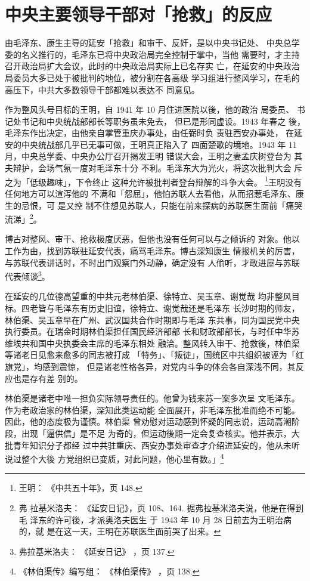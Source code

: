 \section{中央主要领导干部对「抢救」的反应}
由毛泽东、康生主导的延安「抢救」和审干、反奸，是以中央书记处、
中央总学委的名义推行的，毛泽东已将中央政治局完全控制于掌中，当他
需要时，才主持召开政治局扩大会议，此时的中央政治局实际上已名存实
亡，在延安的中央政治局委员大多已处于被批判的地位，被分割在各高级
学习组进行整风学习，在毛的高压下，中共大多数领导干部都难以表达不
同意见。

作为整风头号目标的王明，自 1941 年 10 月住进医院以後，他的政治 局委员、
书记处书记和中央统战部部长等职务虽未免去， 但已是形同虚设。1943 年春之
後，毛泽东作出决定，由他亲自掌管重庆办事处，由任弼时负 责驻西安办事处，
在延安的中央统战部几乎已无事可做，王明真正陷入了 四面楚歌的境地。1943 年
11 月，中央总学委、中央办公厅召开揭发王明 错误大会，王明之妻孟庆树登台为
其夫辩护，会场气氛一度对毛泽东十分 不利。毛泽东大为光火，将这次批判大会
斥之为「低级趣味」，下令终止 这种允许被批判者登台辩解的斗争大会。
\footnote{王明： 《中共五十年》，页 148.}王明没有任何地方可以渲泻他的
不满和「怨屈」，他怕苏联人去看他，从而招惹毛泽东、康生的忌恨，可 是又控
制不住想见苏联人，只能在前来探病的苏联医生面前「痛哭流涕」\footnote{弗
拉基米洛夫： 《延安日记》，页 108、164. 据弗拉基米洛夫说，他是在得到毛
泽东的许可後，才派奥洛夫医生 于 1943 年 10 月 28 日前去为王明治病的，就
是在这一天，王明在苏联医生面前哭了出来。}。

博古对整风、审干、抢救极度厌恶，但他也没有任何可以与之倾诉的
对象。他以工作为由，找到苏联驻延安代表，痛骂毛泽东。博古深知康生
情报机关的厉害，与苏联代表讲话时，不时出门观察门外动静，确定没有
人偷听，才敢进屋与苏联代表倾谈\footnote{弗拉基米洛夫：
《延安日记》
，页 137.}。

在延安的几位德高望重的中共元老林伯渠、徐特立、吴玉章、谢觉哉
均非整风目标。四老皆与毛泽东有历史旧谊，徐特立、谢觉哉还是毛泽东
长沙时期的师友，林伯渠、吴玉章早在广州、武汉国共合作时期即与毛泽
东共事，同为国民党中央执行委员。在瑞金时期林伯渠担任国民经济部部
长和财政部部长，与时任中华苏维埃共和国中央执委会主席的毛泽东相处
融洽。整风转入审干、抢救後，林伯渠等诸老日见愈来愈多的同志被打成
「特务」、「叛徒」，国统区中共组织被诬为「红旗党」，均感到震惊，
但是诸老性格各异，对党内斗争的体会各自深浅不同，其反应也是存有差
别的。

林伯渠是诸老中唯一担负实际领导责任的。他曾为钱来苏一案多次呈
文毛泽东。作为老政治家的林伯渠，深知此类运动能
全面展开，非毛泽东批准而绝不可能。因此，他的态度极为谨慎。林伯渠
曾劝慰对运动感到怀疑的同志说，运动高潮阶段，出现「逼供信」是不足
为奇的，但运动後期一定会复查核实。他并表示，大批青年知识分子都经
过中共驻重庆、西安办事处审查才介绍进延安的，他从未听说过整个大後
方党组织已变质，对此问题，他心里有数。」\footnote{《林伯渠传》编写组：
《林伯渠传》
，页 138.}


